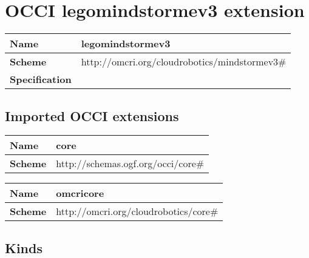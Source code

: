 \section{OCCI legomindstormev3 extension}
\begin{center}
\begin{tabular}{|l|l|}
  \hline
  \textbf{Name} & legomindstormev3 \\
  \hline  
  \textbf{Scheme} & http://omcri.org/cloudrobotics/mindstormev3\# \\
  \hline
  \textbf{Specification} &  \\
  \hline
\end{tabular}
\end{center}

\subsection{Imported OCCI extensions}

\begin{center} 
\begin{tabular}{|l|l|}
  \hline
  \textbf{Name} & core \\
  \hline  
  \textbf{Scheme} & http://schemas.ogf.org/occi/core\# \\
  \hline
\end{tabular}
\end{center}
\begin{center} 
\begin{tabular}{|l|l|}
  \hline
  \textbf{Name} & omcricore \\
  \hline  
  \textbf{Scheme} & http://omcri.org/cloudrobotics/core\# \\
  \hline
\end{tabular}
\end{center}


\subsection{Kinds}
